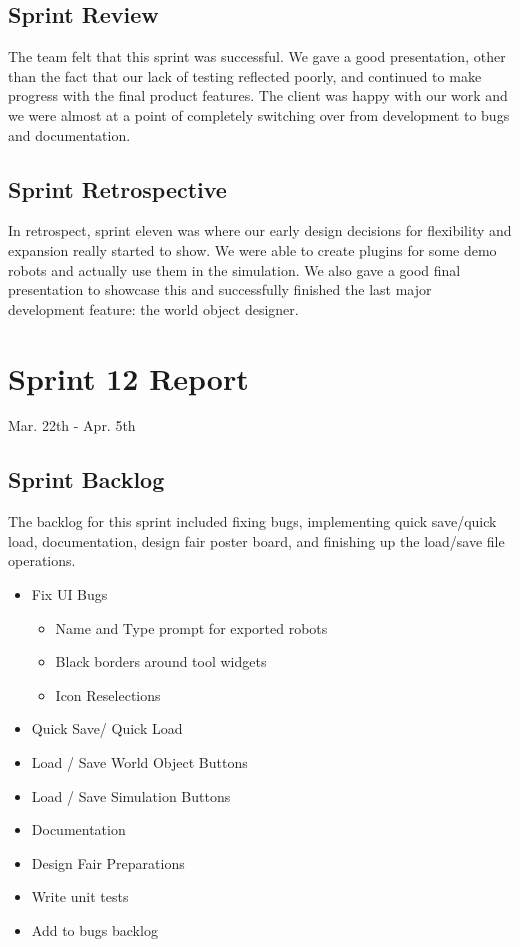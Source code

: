 \subsection{Sprint Review}
The team felt that this sprint was successful. We gave a good presentation, other than the fact that our lack of testing reflected poorly, and continued to make progress with the final product features. The client was happy with our work and we were almost at a point of completely switching over from development to bugs and documentation.

\subsection{Sprint Retrospective}

In retrospect, sprint eleven was where our early design decisions for flexibility and expansion really started to show. We were able to create plugins for some demo robots and actually use them in the simulation. We also gave a good final presentation to showcase this and successfully finished the last major development feature: the world object designer.


\section{Sprint 12 Report}
Mar. 22th - Apr. 5th
\subsection{Sprint Backlog}
The backlog for this sprint included fixing bugs, implementing quick save/quick load, documentation, design fair poster board, and finishing up the load/save file operations.

\begin{itemize}
	\item Fix UI Bugs
	\begin{itemize}
		\item Name and Type prompt for exported robots
		\item Black borders around tool widgets
		\item Icon Reselections
	\end{itemize}
	\item Quick Save/ Quick Load
	\item Load / Save World Object Buttons
	\item Load / Save Simulation Buttons
	\item Documentation
	\item Design Fair Preparations
	\item Write unit tests
	\item Add to bugs backlog
\end{itemize}

